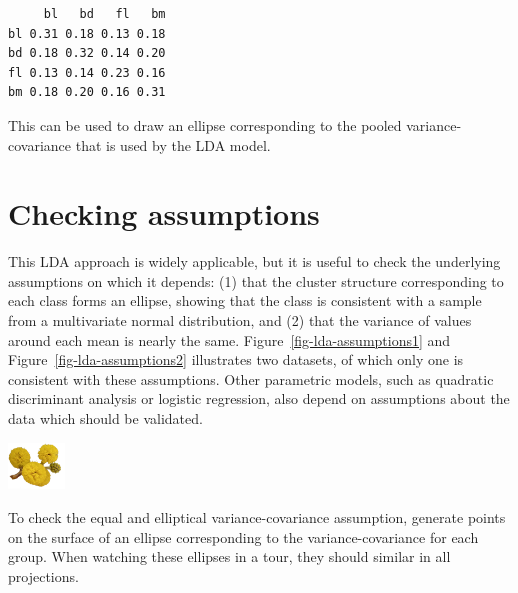 \documentclass[
  letterpaper,
]{krantz}
\newenvironment{Shaded}{\begin{snugshade}}{\end{snugshade}}
\newcommand{\CommentTok}[1]{\textcolor[rgb]{0.37,0.37,0.37}{#1}}
\newcommand{\DecValTok}[1]{\textcolor[rgb]{0.68,0.00,0.00}{#1}}
\newcommand{\FunctionTok}[1]{\textcolor[rgb]{0.28,0.35,0.67}{#1}}
\newcommand{\NormalTok}[1]{\textcolor[rgb]{0.00,0.23,0.31}{#1}}
\newcommand{\OtherTok}[1]{\textcolor[rgb]{0.00,0.23,0.31}{#1}}
\newcommand{\SpecialCharTok}[1]{\textcolor[rgb]{0.37,0.37,0.37}{#1}}
\newcommand{\infobox}[1]{%
\noindent\colorbox{info!30}{%
\begin{minipage}{0.98\linewidth}%
    \centering%
    \begin{minipage}[c]{0.15\linewidth} %
      \includegraphics[width=1.5cm]{images/mulga-flowers2.png} %
    \end{minipage}%
    \hfill %
    \begin{minipage}[c]{0.8\linewidth} %
      \bigskip%
      \textsf{#1}%
      \bigskip%
    \end{minipage}%
    \hspace*{3mm}%
  \end{minipage}%
}%
}
\begin{document}
\begin{Shaded}
\end{Shaded}

\begin{verbatim}
     bl   bd   fl   bm
bl 0.31 0.18 0.13 0.18
bd 0.18 0.32 0.14 0.20
fl 0.13 0.14 0.23 0.16
bm 0.18 0.20 0.16 0.31
\end{verbatim}

This can be used to draw an ellipse corresponding to the pooled
variance-covariance that is used by the LDA model.

\hypertarget{checking-assumptions}{%
\section{Checking assumptions}\label{checking-assumptions}}

This LDA approach is widely applicable, but it is useful to check the
underlying assumptions on which it depends: (1) that the cluster
structure corresponding to each class forms an ellipse, showing that the
class is consistent with a sample from a multivariate normal
distribution, and (2) that the variance of values around each mean is
nearly the same. Figure~\ref{fig-lda-assumptions1} and
Figure~\ref{fig-lda-assumptions2} illustrates two datasets, of which
only one is consistent with these assumptions. Other parametric models,
such as quadratic discriminant analysis or logistic regression, also
depend on assumptions about the data which should be validated.

\infobox{To check the equal and elliptical variance-covariance assumption, generate points on the surface of an ellipse corresponding to the variance-covariance for each group. When watching these ellipses in a tour, they should similar in all projections.
}

 
\end{document}
